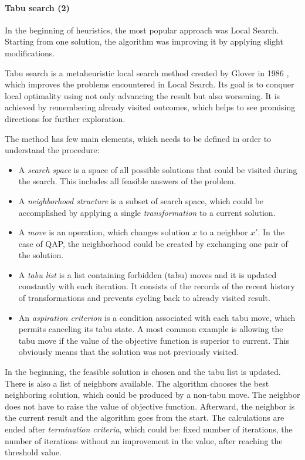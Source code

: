 \paragraph{Tabu search (2)}

In the beginning of heuristics, the most popular approach was Local Search.
Starting from one solution, the algorithm was improving it by applying slight modifications.

Tabu search is a metaheuristic local search method created by Glover in 1986 \cite{glover1986future}, which improves the problems encountered in Local Search.
Its goal is to conquer local optimality using not only advancing the result but also worsening.
It is achieved by remembering already visited outcomes, which helps to see promising directions for further exploration.

The method has few main elements, which needs to be defined in order to understand the procedure:
\begin{itemize}
  \item A \textit{search space} is a space of all possible solutions that could be visited during the search. This includes all feasible answers of the problem.
  \item A \textit{neighborhood structure} is a subset of search space, which could be accomplished by applying a single \textit{transformation} to a current solution.
  \item A \textit{move} is an operation, which changes solution $x$ to a neighbor $x'$. In the case of QAP, the neighborhood could be created by exchanging one pair of the solution.
  \item A \textit{tabu list} is a list containing forbidden (tabu) moves and it is updated constantly with each iteration. It consists of the records of the recent history of transformations and prevents cycling back to already visited result.
  \item An \textit{aspiration criterion} is a condition associated with each tabu move, which permits canceling its tabu state. A most common example is allowing the tabu move if the value of the objective function is superior to current. This obviously means that the solution was not previously visited.
\end{itemize}

In the beginning, the feasible solution is chosen and the tabu list is updated.
There is also a list of neighbors available.
The algorithm chooses the best neighboring solution, which could be produced by a non-tabu move.
The neighbor does not have to raise the value of objective function.
Afterward, the neighbor is the current result and the algorithm goes from the start.
The calculations are ended after \textit{termination criteria}, which could be: fixed number of iterations, the number of iterations without an improvement in the value, after reaching the threshold value.

